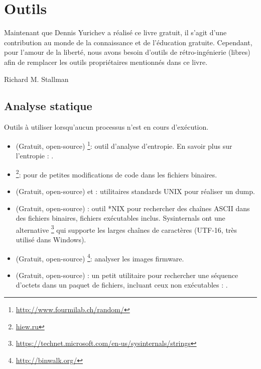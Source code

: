 \chapter{Outils}

\epigraph{Maintenant que Dennis Yurichev a réalisé ce livre gratuit, il s'agit d'une contribution au monde de la connaissance et de l'éducation gratuite.
Cependant, pour l'amour de la liberté, nous avons besoin d'outils de rétro-ingénierie (libres) afin de remplacer les outils propriétaires mentionnés dans ce livre.}{Richard M. Stallman}

\section{Analyse statique}

Outils à utiliser lorsqu'aucun processus n'est en cours d'exécution.


\begin{itemize}
\item
(Gratuit, open-source) \footnote{\url{http://www.fourmilab.ch/random/}}: outil d'analyse d'entropie.
En savoir plus sur l'entropie : .

\item
\label{Hiew}
\footnote{\href{http://go.yurichev.com/17035}{hiew.ru}}:
pour de petites modifications de code dans les fichiers binaires.

\item (Gratuit, open-source)  et : utilitaires standards UNIX pour réaliser un dump.

\item (Gratuit, open-source) : outil *NIX pour rechercher des chaînes ASCII dans des fichiers binaires, fichiers exécutables inclus.
Sysinternals ont une alternative \footnote{\url{https://technet.microsoft.com/en-us/sysinternals/strings}}
qui supporte les larges chaînes de caractères (UTF-16, très utilisé dans Windows).

\item (Gratuit, open-source) \footnote{\url{http://binwalk.org/}}: analyser les images firmware.

\item
{}
(Gratuit, open-source) :
un petit utilitaire pour rechercher une séquence d'octets dans un paquet de fichiers,
incluant ceux non exécutables : \BGREPURL.
\end{itemize}

